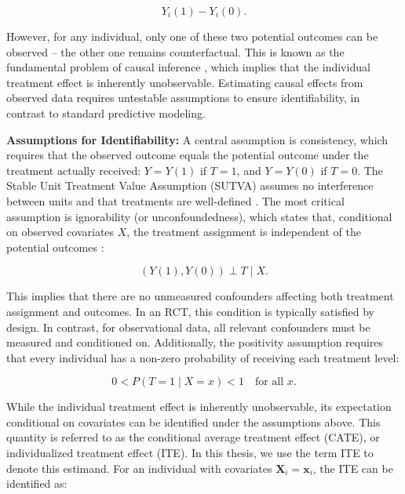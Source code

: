 \begin{equation}
Y_i(1) - Y_i(0).
\end{equation}



However, for any individual, only one of these two potential outcomes can be observed -- the other one remains counterfactual. This is known as the fundamental problem of causal inference \citep{holland1986}, which implies that the individual treatment effect is inherently unobservable. Estimating causal effects from observed data requires untestable assumptions to ensure identifiability, in contrast to standard predictive modeling.


\medskip 

\textbf{Assumptions for Identifiability:} A central assumption is consistency, which requires that the observed outcome equals the potential outcome under the treatment actually received: $Y = Y(1)$ if $T = 1$, and $Y = Y(0)$ if $T = 0$. The Stable Unit Treatment Value Assumption (SUTVA) assumes no interference between units and that treatments are well-defined \citep{rubin1980}. The most critical assumption is ignorability (or unconfoundedness), which states that, conditional on observed covariates $X$, the treatment assignment is independent of the potential outcomes \citep{rosenbaum1983}:

\begin{equation}
(Y(1), Y(0)) \perp T \mid X.
\end{equation}

This implies that there are no unmeasured confounders affecting both treatment assignment and outcomes. In an RCT, this condition is typically satisfied by design. In contrast, for observational data, all relevant confounders must be measured and conditioned on. Additionally, the positivity assumption requires that every individual has a non-zero probability of receiving each treatment level:

\begin{equation}
0 < P(T = 1 \mid X = x) < 1 \quad \text{for all } x.
\end{equation}

\medskip

While the individual treatment effect is inherently unobservable, its expectation conditional on covariates can be identified under the assumptions above. This quantity is referred to as the conditional average treatment effect (CATE), or individualized treatment effect (ITE). In this thesis, we use the term ITE to denote this estimand. For an individual with covariates \( \mathbf{X}_i = \mathbf{x}_i \), the ITE can be identified as:


